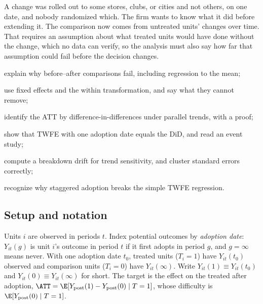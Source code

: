 \documentclass[11pt]{article}
\begin{document}

\begin{decision}
A change was rolled out to some stores, clubs, or cities and not others, on one date, and nobody randomized which. The firm wants
to know what it did before extending it. The comparison now comes from untreated units' changes over time. That requires an
assumption about what treated units would have done without the change, which no data can verify, so the analysis must also say
how far that assumption could fail before the decision changes.
\end{decision}

\begin{goals}
  \item explain why before--after comparisons fail, including regression to the mean;
  \item use fixed effects and the within transformation, and say what they cannot remove;
  \item identify the ATT by difference-in-differences under parallel trends, with a proof;
  \item show that TWFE with one adoption date equals the DiD, and read an event study;
  \item compute a breakdown drift for trend sensitivity, and cluster standard errors correctly;
  \item recognize why staggered adoption breaks the simple TWFE regression.
\end{goals}

\sectionone

\subsection{Setup and notation}

Units $i$ are observed in periods $t$. Index potential outcomes by \emph{adoption date}: $Y_{it}(g)$ is unit $i$'s outcome in period $t$
if it first adopts in period $g$, and $g = \infty$ means never. With one adoption date $t_0$, treated units ($T_i = 1$) have
$Y_{it}(t_0)$ observed and comparison units ($T_i = 0$) have $Y_{it}(\infty)$. Write $Y_{it}(1) \equiv Y_{it}(t_0)$ and
$Y_{it}(0) \equiv Y_{it}(\infty)$ for short. The target is the effect on the treated after adoption,
$\ATT = \E[Y_{\text{post}}(1) - Y_{\text{post}}(0) \mid T = 1]$, whose difficulty is $\E[Y_{\text{post}}(0) \mid T = 1]$.
\end{document}
